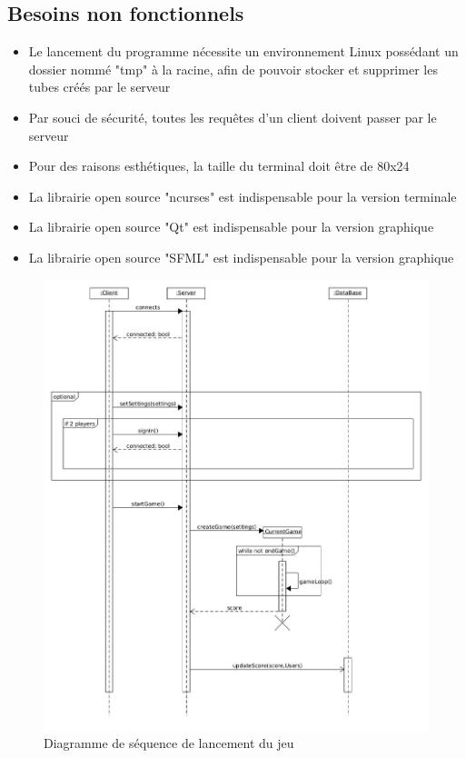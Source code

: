 \documentclass[a4paper,12pt]{article}
\begin{document}
\subsection{Besoins non fonctionnels}
\begin{itemize}
    \item Le lancement du programme nécessite un environnement Linux possédant un dossier nommé "tmp" à la racine, afin de pouvoir stocker et supprimer les tubes créés par le serveur
    \item Par souci de sécurité, toutes les requêtes d'un client doivent passer par le serveur
    \item Pour des raisons esthétiques, la taille du terminal doit être de 80x24
    \item La librairie open source "ncurses" est indispensable pour la version terminale
    \item La librairie open source "Qt" est indispensable pour la version graphique
    \item La librairie open source "SFML" est indispensable pour la version graphique
    
\end{itemize}

\begin{figure}
\centering
\includegraphics[scale=0.3]{images/sequence_diagram_StartGame}
\caption{Diagramme de séquence de lancement du jeu}
\end{figure}
\end{document}
